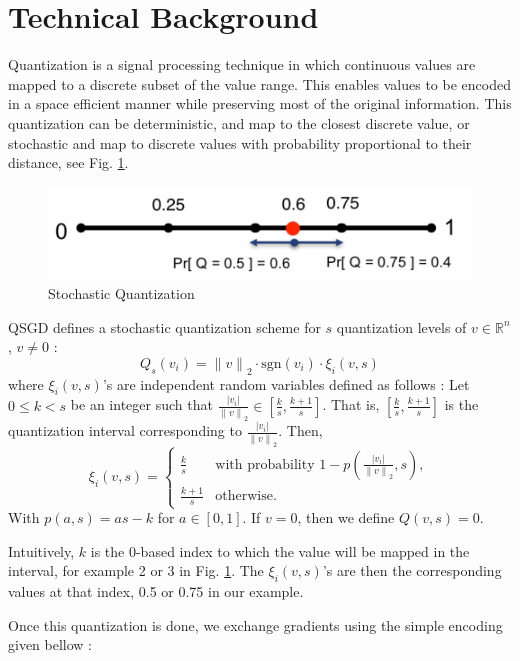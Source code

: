 \documentclass[10pt,conference,compsocconf]{IEEEtran}
\begin{document}
\section{Technical Background}

Quantization is a signal processing technique in which continuous values are mapped to a discrete subset of the value range. This enables values to be encoded in a space efficient manner while preserving most of the original information. This quantization can be deterministic, and map to the closest discrete value, or stochastic and map to discrete values with probability proportional to their distance, see Fig. \ref{fig:quant}. 

\begin{figure}[b]
  \centering
  \includegraphics[scale=0.45]{quant}
  \caption{Stochastic Quantization}
  \vspace{-3mm}
  \label{fig:quant}
\end{figure}

QSGD defines a stochastic quantization scheme for $s$ quantization levels of $v \in \mathbb{R}^{n}$, $v \neq 0$ :
\[Q_s(v_i) = {\lVert v \rVert}_2 \cdot \text{{sgn}}(v_i) \cdot \xi_i(v, s)\]
where $\xi_i(v, s)$'s are independent random variables defined as follows : Let $0 \leq k < s$ be an integer such that $\frac{{\lvert v_i \rvert}}{{\lVert v \rVert}_2} \in [\frac{k}{s}, \frac{k + 1}{s}]$. That is, $[\frac{k}{s}, \frac{k + 1}{s}]$ is the quantization interval corresponding to $\frac{{\lvert v_i \rvert}}{{\lVert v \rVert}_2}$. Then,
\[\xi_i(v, s) = \begin{cases}
\frac{k}{s} & \text{{with probability }} 1 - p\left(\frac{{\lvert v_i \rvert}}{{\lVert v \rVert}_2}, s\right), \\
\frac{k + 1}{s} & \text{{otherwise}}.
\end{cases}\]
With $p(a, s) = as - k$ for $a \in [0, 1]$. If $v = 0$, then we define $Q(v, s) = 0$. 

Intuitively, $k$ is the 0-based index to which the value will be mapped in the interval, for example 2 or 3 in Fig. \ref{fig:quant}. The $\xi_i(v, s)$'s are then the corresponding values at that index, 0.5 or 0.75 in our example.

Once this quantization is done, we exchange gradients using the simple encoding given bellow :
\end{document}
